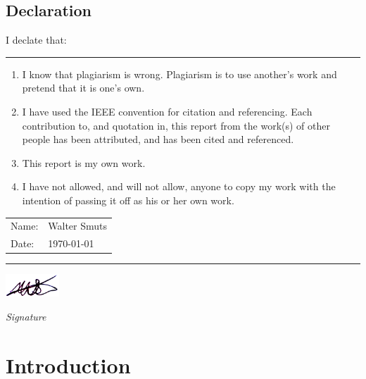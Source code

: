 \documentclass[12pt, twoside, openright]{report}
\begin{document}
\vfill
\vfill

\newpage
\null
\vfill

\section*{\center Declaration}
\thispagestyle{plain}

I declate that:
\vspace{3mm}
\hrule
\begin{enumerate}
\item
I know that plagiarism is wrong. Plagiarism is to use another’s work and
pretend that it is one’s own.
\item
I have used the IEEE convention for citation and referencing. Each contribution
to, and quotation in, this report from the work(s) of other people has been
attributed, and has been cited and referenced.
\item
This report is my own work.
\item
I have not allowed, and will not allow, anyone to copy my work with the
intention of passing it off as his or her own work.
\end{enumerate}

\begin{tabular}{ l l }
 Name: &  Walter Smuts\\
 Date: & \today
\end{tabular}
\vspace{3mm}
\hrule
\vspace{3mm}
\includegraphics[width=2cm]{Signature.png}
\par {\it Signature}

\vfill
\vfill

\tableofcontents
\thispagestyle{plain}


\chapter{Introduction}
\setcounter{page}{1}

\end{document}
